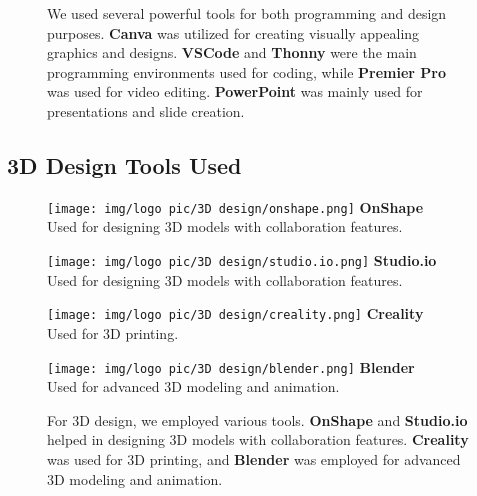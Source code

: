 \begin{figure}[htbp]
    \vspace{0.5cm}
    \noindent
    We used several powerful tools for both programming and design purposes. \textbf{Canva} was utilized for creating visually appealing graphics and designs. \textbf{VSCode} and \textbf{Thonny} were the main programming environments used for coding, while \textbf{Premier Pro} was used for video editing. \textbf{PowerPoint} was mainly used for presentations and slide creation.
\end{figure}

\subsection{3D Design Tools Used}
\begin{figure}[htbp]
    \centering
    \begin{minipage}{0.2\textwidth}
        \centering
        \texttt{[image: img/logo pic/3D design/onshape.png]}
        \vspace{0.3cm}
        \textbf{OnShape}\\
        \small{Used for designing 3D models with collaboration features.}
    \end{minipage}%
    \hfill
    \begin{minipage}{0.2\textwidth}
        \centering
        \texttt{[image: img/logo pic/3D design/studio.io.png]}
        \vspace{0.3cm}
        \textbf{Studio.io}\\
        \small{Used for designing 3D models with collaboration features.}
    \end{minipage}%
    \hfill
    \begin{minipage}{0.2\textwidth}
        \centering
        \texttt{[image: img/logo pic/3D design/creality.png]}
        \vspace{0.3cm}
        \textbf{Creality}\\
        \small{Used for 3D printing.}
    \end{minipage}%
    \hfill
    \begin{minipage}{0.2\textwidth}
        \centering
        \texttt{[image: img/logo pic/3D design/blender.png]}
        \vspace{0.3cm}
        \textbf{Blender}\\
        \small{Used for advanced 3D modeling and animation.}
    \end{minipage}
    
    \vspace{0.5cm}
    \noindent
     For 3D design, we employed various tools. \textbf{OnShape} and \textbf{Studio.io} helped in designing 3D models with collaboration features. \textbf{Creality} was used for 3D printing, and \textbf{Blender} was employed for advanced 3D modeling and animation.
\end{figure}

